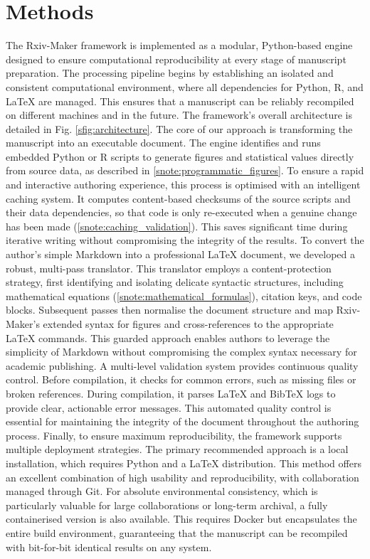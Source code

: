 \documentclass[times, twoside]{rxiv_maker_style}
\begin{document}
\section*{Methods}
The Rxiv-Maker framework is implemented as a modular, Python-based engine designed to ensure computational reproducibility at every stage of manuscript preparation. The processing pipeline begins by establishing an isolated and consistent computational environment, where all dependencies for Python, R, and LaTeX are managed. This ensures that a manuscript can be reliably recompiled on different machines and in the future. The framework's overall architecture is detailed in Fig. \ref{sfig:architecture}.
The core of our approach is transforming the manuscript into an executable document. The engine identifies and runs embedded Python or R scripts to generate figures and statistical values directly from source data, as described in \ref{snote:programmatic_figures}. To ensure a rapid and interactive authoring experience, this process is optimised with an intelligent caching system. It computes content-based checksums of the source scripts and their data dependencies, so that code is only re-executed when a genuine change has been made (\ref{snote:caching_validation}). This saves significant time during iterative writing without compromising the integrity of the results.
To convert the author's simple Markdown into a professional LaTeX document, we developed a robust, multi-pass translator. This translator employs a content-protection strategy, first identifying and isolating delicate syntactic structures, including mathematical equations (\ref{snote:mathematical_formulas}), citation keys, and code blocks. Subsequent passes then normalise the document structure and map Rxiv-Maker's extended syntax for figures and cross-references to the appropriate LaTeX commands. This guarded approach enables authors to leverage the simplicity of Markdown without compromising the complex syntax necessary for academic publishing.
A multi-level validation system provides continuous quality control. Before compilation, it checks for common errors, such as missing files or broken references. During compilation, it parses LaTeX and BibTeX logs to provide clear, actionable error messages. This automated quality control is essential for maintaining the integrity of the document throughout the authoring process.
Finally, to ensure maximum reproducibility, the framework supports multiple deployment strategies. The primary recommended approach is a local installation, which requires Python and a LaTeX distribution. This method offers an excellent combination of high usability and reproducibility, with collaboration managed through Git. For absolute environmental consistency, which is particularly valuable for large collaborations or long-term archival, a fully containerised version is also available. This requires Docker but encapsulates the entire build environment, guaranteeing that the manuscript can be recompiled with bit-for-bit identical results on any system.

\onecolumn
\newpage



\end{document}
